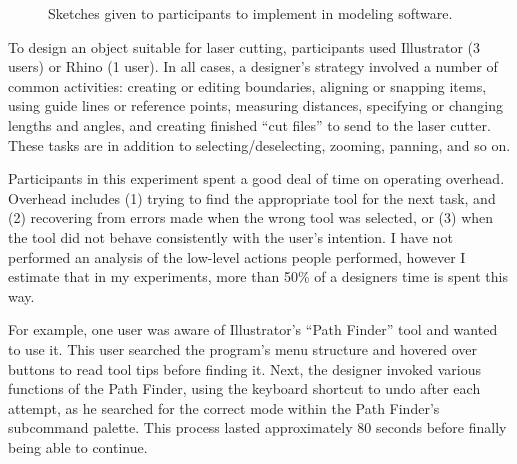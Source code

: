 \documentclass[11pt]{article}
\begin{document}
\begin{figure}[h]
\centering 
{}
\hspace{1cm} 
\caption{Sketches given to participants to implement in modeling software.}
\label{fig:interview-sketch}
\end{figure}

To design an object suitable for laser cutting, participants used
Illustrator (3 users) or Rhino (1 user). In all cases, a designer's
strategy involved a number of common activities: creating or editing
boundaries, aligning or snapping items, using guide lines or reference
points, measuring distances, specifying or changing lengths and
angles, and creating finished ``cut files'' to send to the laser
cutter. These tasks are in addition to selecting/deselecting, zooming,
panning, and so on.

Participants in this experiment spent a good deal of time on operating
overhead. Overhead includes (1) trying to find the appropriate tool
for the next task, and (2) recovering from errors made when the wrong
tool was selected, or (3) when the tool did not behave consistently
with the user's intention. I have not performed an analysis of the
low-level actions people performed, however I estimate that in my
experiments, more than 50\% of a designers time is spent this way.

For example, one user was aware of Illustrator's ``Path Finder'' tool
and wanted to use it. This user searched the program's menu structure
and hovered over buttons to read tool tips before finding it. Next,
the designer invoked various functions of the Path Finder, using the
keyboard shortcut to undo after each attempt, as he searched for the
correct mode within the Path Finder's subcommand palette. This process
lasted approximately 80 seconds before finally being able to continue.
\end{document}
